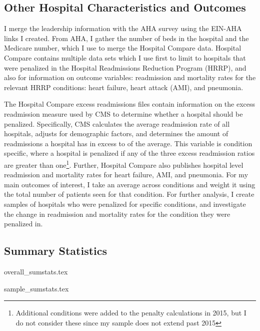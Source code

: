 \documentclass[12pt]{article}
\begin{document}
    \subsection{Other Hospital Characteristics and Outcomes}

    I merge the leadership information with the AHA survey using the EIN-AHA links I created. From AHA, I gather the number of beds in the hospital and the Medicare number, which I use to merge the Hospital Compare data. Hospital Compare contains multiple data sets which I use first to limit to hospitals that were penalized in the Hospital Readmissions Reduction Program (HRRP), and also for information on outcome variables: readmission and mortality rates for the relevant HRRP conditions: heart failure, heart attack (AMI), and pneumonia.

    The Hospital Compare excess readmissions files contain information on the excess readmission measure used by CMS to determine whether a hospital should be penalized. Specifically, CMS calculates the average readmission rate of all hospitals, adjusts for demographic factors, and determines the amount of readmissions a hospital has in excess to of the average. This variable is condition specific, where a hospital is penalized if any of the three excess readmission ratios are greater than one\footnote{Additional conditions were added to the penalty calculations in 2015, but I do not consider these since my sample does not extend past 2015}. Further, Hospital Compare also publishes hospital level readmission and mortality rates for heart failure, AMI, and pneumonia. For my main outcomes of interest, I take an average across conditions and weight it using the total number of patients seen for that condition. For further analysis, I create samples of hospitals who were penalized for specific conditions, and investigate the change in readmission and mortality rates for the condition they were penalized in.

    \subsection{Summary Statistics}

    {overall_sumstats.tex}

    {sample_sumstats.tex}
\end{document}
